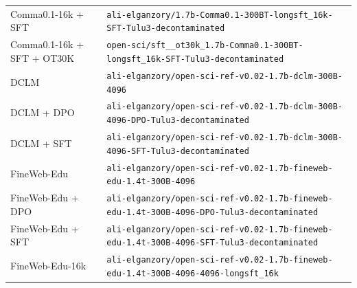 \begin{table}[ht]
\begin{tabular}{lp{10cm}}
Comma0.1-16k + SFT & \texttt{ali-\allowbreak{}elganzory/\allowbreak{}1.7b-\allowbreak{}Comma0.1-\allowbreak{}300BT-\allowbreak{}longsft\_16k-\allowbreak{}SFT-\allowbreak{}Tulu3-\allowbreak{}decontaminated} \\
Comma0.1-16k + SFT + OT30K & \texttt{open-\allowbreak{}sci/\allowbreak{}sft\_\_ot30k\_1.7b-\allowbreak{}Comma0.1-\allowbreak{}300BT-\allowbreak{}longsft\_16k-\allowbreak{}SFT-\allowbreak{}Tulu3-\allowbreak{}decontaminated} \\
DCLM & \texttt{ali-\allowbreak{}elganzory/\allowbreak{}open-\allowbreak{}sci-\allowbreak{}ref-\allowbreak{}v0.02-\allowbreak{}1.7b-\allowbreak{}dclm-\allowbreak{}300B-\allowbreak{}4096} \\
DCLM + DPO & \texttt{ali-\allowbreak{}elganzory/\allowbreak{}open-\allowbreak{}sci-\allowbreak{}ref-\allowbreak{}v0.02-\allowbreak{}1.7b-\allowbreak{}dclm-\allowbreak{}300B-\allowbreak{}4096-\allowbreak{}DPO-\allowbreak{}Tulu3-\allowbreak{}decontaminated} \\
DCLM + SFT & \texttt{ali-\allowbreak{}elganzory/\allowbreak{}open-\allowbreak{}sci-\allowbreak{}ref-\allowbreak{}v0.02-\allowbreak{}1.7b-\allowbreak{}dclm-\allowbreak{}300B-\allowbreak{}4096-\allowbreak{}SFT-\allowbreak{}Tulu3-\allowbreak{}decontaminated} \\
FineWeb-Edu & \texttt{ali-\allowbreak{}elganzory/\allowbreak{}open-\allowbreak{}sci-\allowbreak{}ref-\allowbreak{}v0.02-\allowbreak{}1.7b-\allowbreak{}fineweb-\allowbreak{}edu-\allowbreak{}1.4t-\allowbreak{}300B-\allowbreak{}4096} \\
FineWeb-Edu + DPO & \texttt{ali-\allowbreak{}elganzory/\allowbreak{}open-\allowbreak{}sci-\allowbreak{}ref-\allowbreak{}v0.02-\allowbreak{}1.7b-\allowbreak{}fineweb-\allowbreak{}edu-\allowbreak{}1.4t-\allowbreak{}300B-\allowbreak{}4096-\allowbreak{}DPO-\allowbreak{}Tulu3-\allowbreak{}decontaminated} \\
FineWeb-Edu + SFT & \texttt{ali-\allowbreak{}elganzory/\allowbreak{}open-\allowbreak{}sci-\allowbreak{}ref-\allowbreak{}v0.02-\allowbreak{}1.7b-\allowbreak{}fineweb-\allowbreak{}edu-\allowbreak{}1.4t-\allowbreak{}300B-\allowbreak{}4096-\allowbreak{}SFT-\allowbreak{}Tulu3-\allowbreak{}decontaminated} \\
FineWeb-Edu-16k & \texttt{ali-\allowbreak{}elganzory/\allowbreak{}open-\allowbreak{}sci-\allowbreak{}ref-\allowbreak{}v0.02-\allowbreak{}1.7b-\allowbreak{}fineweb-\allowbreak{}edu-\allowbreak{}1.4t-\allowbreak{}300B-\allowbreak{}4096-\allowbreak{}4096-\allowbreak{}longsft\_16k} \\

\end{tabular}
\end{table}
